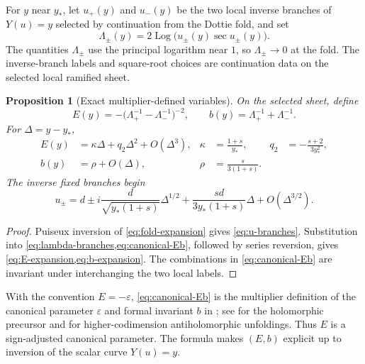 \documentclass[11pt]{article}
\newtheorem{proposition}[theorem]{Proposition}
\theoremstyle{definition}
\theoremstyle{remark}
\newcommand{\Logp}{\operatorname{Log}}
\begin{document}
For $y$ near $y_*$, let $u_+(y)$ and $u_-(y)$ be the two local inverse branches of $Y(u)=y$ selected by continuation from the Dottie fold, and set
\begin{equation}
  \Lambda_\pm(y)=2\Logp\!\bigl(u_\pm(y)\sec u_\pm(y)\bigr).
  \label{eq:lambda-branches}
\end{equation}
The quantities $\Lambda_\pm$ use the principal logarithm near $1$, so $\Lambda_\pm\to0$ at the fold.  The inverse-branch labels and square-root choices are continuation data on the selected local ramified sheet.

\begin{proposition}[Exact multiplier-defined variables]\label{prop:canonical}
On the selected sheet, define
\begin{equation}
  E(y)=-\bigl(\Lambda_+^{-1}-\Lambda_-^{-1}\bigr)^{-2},
  \qquad
  b(y)=\Lambda_+^{-1}+\Lambda_-^{-1}.
  \label{eq:canonical-Eb}
\end{equation}
For $\Delta=y-y_*$,
\begin{align}
  E(y)&=\kappa\Delta+q_2\Delta^2+O(\Delta^3),
  &\kappa&=\frac{1+s}{y_*},
  &q_2&=-\frac{s+2}{3y_*^2},
  \label{eq:E-expansion}\\
  b(y)&=\rho+O(\Delta),
  &\rho&=\frac{s}{3(1+s)}.
  \label{eq:b-expansion}
\end{align}
The inverse fixed branches begin
\begin{equation}
  u_\pm=d
  \pm i\frac{d}{\sqrt{y_*(1+s)}}\Delta^{1/2}
  +\frac{sd}{3y_*(1+s)}\Delta+O(\Delta^{3/2}).
  \label{eq:u-branches}
\end{equation}
\end{proposition}

\begin{proof}
Puiseux inversion of \cref{eq:fold-expansion} gives \cref{eq:u-branches}.  Substitution into \cref{eq:lambda-branches,eq:canonical-Eb}, followed by series reversion, gives \cref{eq:E-expansion,eq:b-expansion}.  The combinations in \cref{eq:canonical-Eb} are invariant under interchanging the two local labels.
\end{proof}

With the convention $E=-\varepsilon$, \cref{eq:canonical-Eb} is the multiplier definition of the canonical parameter $\varepsilon$ and formal invariant $b$ in \citet[Theorem~3.3.2]{GodinRousseau2023}; see \citet{MardesicRoussarieRousseau2004,ChristopherRousseau2014} for the holomorphic precursor and \citet{Rousseau2026} for higher-codimension antiholomorphic unfoldings.  Thus $E$ is a sign-adjusted canonical parameter.  The formula makes $(E,b)$ explicit up to inversion of the scalar curve $Y(u)=y$.
\end{document}
